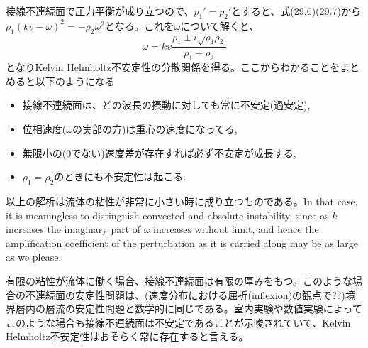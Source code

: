 \documentclass[11pt,a4paper]{jsarticle}
\begin{document}
接線不連続面で圧力平衡が成り立つので、$p_1'=p_2'$とすると、式(29.6)(29.7)から$\rho_1(kv-\omega)^2=-\rho_2\omega^2$となる。これを$\omega$について解くと、
\begin{equation}
\omega=kv\frac{\rho_1\pm i\sqrt{\rho_1\rho_2}}{\rho_1+\rho_2}\tag{29.8}
\end{equation}
となりKelvin Helmholtz不安定性の分散関係を得る。ここからわかることをまとめると以下のようになる
\begin{itemize}
\item 接線不連続面は、どの波長の摂動に対しても常に不安定(過安定),
\item 位相速度($\omega$の実部の方)は重心の速度になってる,
\item 無限小の(0でない)速度差が存在すれば必ず不安定が成長する,
\item $\rho_1=\rho_2$のときにも不安定性は起こる.
\end{itemize}

以上の解析は流体の粘性が非常に小さい時に成り立つものである。In that case, it is meaningless to distinguish convected and absolute instability, since as $k$ increases the imaginary part of $\omega$ increases without limit, and hence the amplification coefficient of the perturbation as it is carried along may be as large as we please.

有限の粘性が流体に働く場合、接線不連続面は有限の厚みをもつ。このような場合の不連続面の安定性問題は、(速度分布における屈折(inflexion)の観点で??)境界層内の層流の安定性問題と数学的に同じである。室内実験や数値実験によってこのような場合も接線不連続面は不安定であることが示唆されていて、Kelvin Helmholtz不安定性はおそらく常に存在すると言える。
\end{document}
